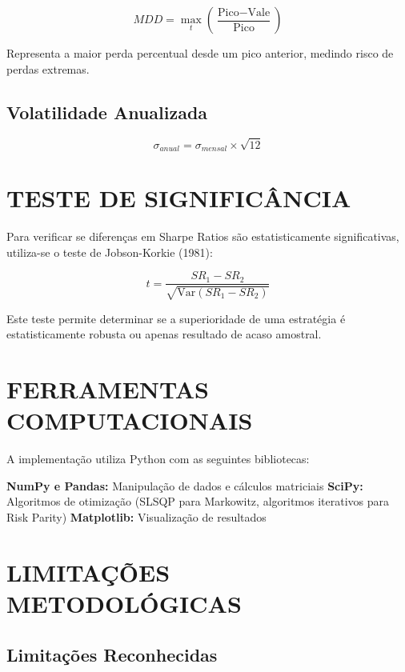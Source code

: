 \begin{equation}
MDD = \max_{t} \left( \frac{\text{Pico} - \text{Vale}}{\text{Pico}} \right)
\end{equation}

Representa a maior perda percentual desde um pico anterior, medindo risco de perdas extremas.

\subsection{Volatilidade Anualizada}

\begin{equation}
\sigma_{anual} = \sigma_{mensal} \times \sqrt{12}
\end{equation}

\section{TESTE DE SIGNIFICÂNCIA}

Para verificar se diferenças em Sharpe Ratios são estatisticamente significativas, utiliza-se o teste de Jobson-Korkie (1981):

\begin{equation}
t = \frac{SR_1 - SR_2}{\sqrt{\text{Var}(SR_1 - SR_2)}}
\end{equation}

Este teste permite determinar se a superioridade de uma estratégia é estatisticamente robusta ou apenas resultado de acaso amostral.

\section{FERRAMENTAS COMPUTACIONAIS}

A implementação utiliza Python com as seguintes bibliotecas:

\textbf{NumPy e Pandas:} Manipulação de dados e cálculos matriciais
\textbf{SciPy:} Algoritmos de otimização (SLSQP para Markowitz, algoritmos iterativos para Risk Parity)
\textbf{Matplotlib:} Visualização de resultados

\section{LIMITAÇÕES METODOLÓGICAS}

\subsection{Limitações Reconhecidas}

